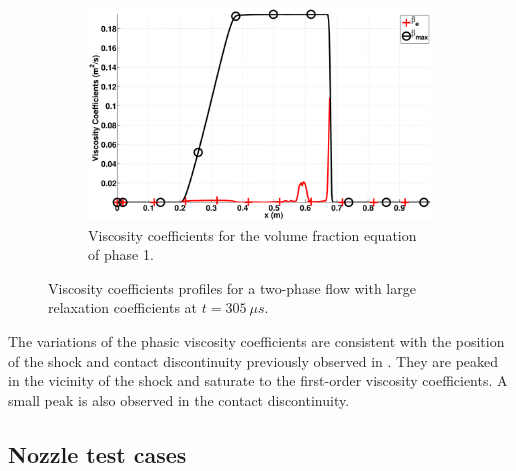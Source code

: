 \documentclass[preprint,10pt]{elsarticle}
\begin{document}
\begin{figure}[H]
        \begin{subfigure}[b]{0.495\textwidth}
                \centering
                \includegraphics[width=\textwidth]{figures/relaxation_phase_1_beta.eps}
                \caption{Viscosity coefficients for the volume fraction equation of phase 1.}
                \label{fig:inf-rel-beta}
        \end{subfigure}        
        \caption{Viscosity coefficients profiles for a two-phase flow with large relaxation coefficients at $t=305 \ \mu s$.}\label{fig:inf-rel-visc-coeff}
\end{figure}
%
The variations of the phasic viscosity coefficients are consistent with the position of the shock and contact discontinuity previously observed in . They are peaked in the vicinity of the shock and saturate to the first-order viscosity coefficients. A small peak is also observed in the contact discontinuity.\\
%

\subsection{Nozzle test cases}\label{sec:1d-results-nozzle}
%

\end{document}
